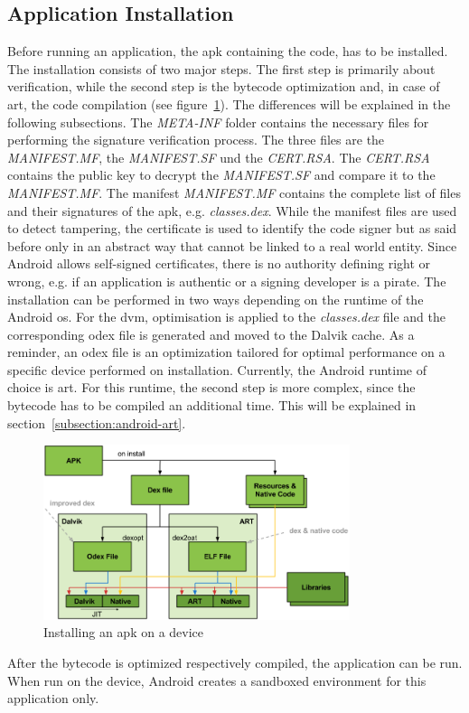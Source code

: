 \subsection{Application Installation} \label{subsection:android-install}
Before running an application, the \gls{apk} containing the code, has to be installed.
The installation consists of two major steps.
The first step is primarily about verification, while the second step is the bytecode optimization and, in case of \gls{art}, the code compilation (see figure~\ref{fig:install}).
The differences will be explained in the following subsections.
\newline
The \textit{META-INF} folder contains the necessary files for performing the signature verification process.
The three files are the \textit{MANIFEST.MF}, the \textit{MANIFEST.SF} und the \textit{CERT.RSA}.
The \textit{CERT.RSA} contains the public key to decrypt the \textit{MANIFEST.SF} and compare it to the \textit{MANIFEST.MF}.
The manifest \textit{MANIFEST.MF} contains the complete list of files and their signatures of the \gls{apk}, e.g. \textit{classes.dex}.
While the manifest files are used to detect tampering, the certificate is used to identify the code signer but as said before only in an abstract way that cannot be linked to a real world entity.
Since Android allows self-signed certificates, there is no authority defining right or wrong, e.g. if an application is authentic or a signing developer is a pirate. \cite{codeSigning} \cite{androidSigning} \cite{nelenkovSelf}
\newline
The installation can be performed in two ways depending on the runtime of the Android \gls{os}.
For the \gls{dvm}, optimisation is applied to the \textit{classes.dex} file and the corresponding \gls{odex} file is generated and moved to the Dalvik cache.
As a reminder, an \gls{odex} file is an optimization tailored for optimal performance on a specific device performed on installation.
\newline
Currently, the Android runtime of choice is \gls{art}.
For this runtime, the second step is more complex, since the bytecode has to be compiled an additional time.
This will be explained in section~\ref{subsection:android-art}.
\newline
\begin{figure}[h]
    \centering
    \includegraphics[width=0.8\textwidth]{data/install.png}
    \caption{Installing an \gls{apk} on a device \cite{googleIOArt}}
    \label{fig:install}
\end{figure}
\newline
After the bytecode is optimized respectively compiled, the application can be run.
When run on the device, Android creates a sandboxed environment for this application only.
